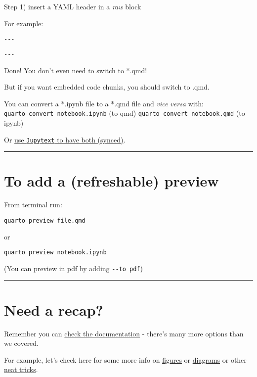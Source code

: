 \documentclass[
  letterpaper,
  DIV=11,
  numbers=noendperiod]{scrartcl}
\begin{document}
Step 1) insert a YAML header in a \emph{raw} block

For example:

\texttt{-\/-\/-}

\texttt{-\/-\/-}

Done! You don't even need to switch to *.qmd!

But if you want embedded code chunks, you should switch to .qmd.

You can convert a *.ipynb file to a *.qmd file and \emph{vice versa}
with: \texttt{quarto\ convert\ notebook.ipynb} (to qmd)
\texttt{quarto\ convert\ notebook.qmd} (to ipynb)

Or \href{https://jupytext.readthedocs.io/en/latest/}{use
\texttt{Jupytext} to have both (synced)}.

\begin{center}\rule{0.5\linewidth}{0.5pt}\end{center}

\hypertarget{to-add-a-refreshable-preview}{%
\section{To add a (refreshable)
preview}\label{to-add-a-refreshable-preview}}

From terminal run:

\texttt{quarto\ preview\ file.qmd}

or

\texttt{quarto\ preview\ notebook.ipynb}

(You can preview in pdf by adding \texttt{-\/-to\ pdf})

\begin{center}\rule{0.5\linewidth}{0.5pt}\end{center}

\hypertarget{need-a-recap}{%
\section{Need a recap?}\label{need-a-recap}}

Remember you can
\href{https://quarto.org/docs/authoring/markdown-basics.html}{check the
documentation} - there's many more options than we covered.

For example, let's check here for some more info on
\href{https://quarto.org/docs/authoring/figures.html}{figures} or
\href{https://quarto.org/docs/authoring/diagrams.html}{diagrams} or
other \href{https://quarto.org/docs/authoring/notebook-embed.html}{neat
tricks}.
\end{document}
